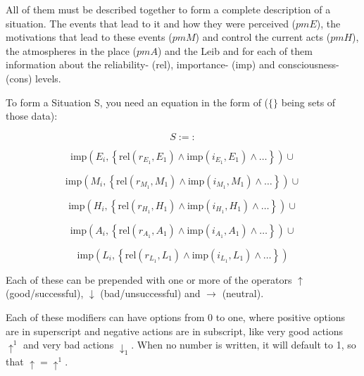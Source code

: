 \documentclass{scrartcl}
\begin{document}
All of them must be described together to form a complete description of a situation. 
The events that lead to it and how they were perceived ($p m E$), the motivations that lead to these events ($p m M$)
and control the current acts ($p m H$), the atmospheres in the place ($p m A$) and the Leib and for each of them information
about the reliability- (rel), importance- (imp) and consciousness- (cons) levels.

To form a Situation S, you need an equation in the form of ($\{\}$ being sets of those data):

\begin{equation}
	S :=: 
\end{equation}

\begin{equation}
	\left.
		\mathrm{imp}\left(E_i, \left\{\textrm{rel}\left(r_{E_1}, E_1\right) \wedge \textrm{imp}\left(i_{E_1}, E_1\right) \wedge \dots\right\}\right) \cup
	\right.
\end{equation}

\begin{equation}
	\left.
		\mathrm{imp}\left(M_i, \left\{\textrm{rel}\left(r_{M_1}, M_1\right) \wedge \textrm{imp}\left(i_{M_1}, M_1\right) \wedge \dots\right\}\right) \cup
	\right.
\end{equation}

\begin{equation}
	\left.
		\mathrm{imp}\left(H_i, \left\{\textrm{rel}\left(r_{H_1}, H_1\right) \wedge \textrm{imp}\left(i_{H_1}, H_1\right) \wedge \dots\right\}\right) \cup
	\right.
\end{equation}

\begin{equation}
	\left.
		\mathrm{imp}\left(A_i, \left\{\textrm{rel}\left(r_{A_1}, A_1\right) \wedge \textrm{imp}\left(i_{A_1}, A_1\right) \wedge \dots\right\}\right) \cup
	\right.
\end{equation}

\begin{equation}
	\left.
		\mathrm{imp}\left(L_i, \left\{\textrm{rel}\left(r_{L_1}, L_1\right) \wedge \textrm{imp}\left(i_{L_1}, L_1\right) \wedge \dots\right\}\right)
	\right.
\end{equation}

Each of these can be prepended with one or more of the operators $\uparrow$ (good/successful), $\downarrow$ (bad/unsuccessful) and $\rightarrow$ (neutral).

Each of these modifiers can have options from 0 to one, where positive options are in superscript and negative actions are in subscript, like
very good actions $\uparrow^1$ and very bad actions $\downarrow_1$. When no number is written, it will default to 1, so that $\uparrow = \uparrow^1$.
\end{document}
